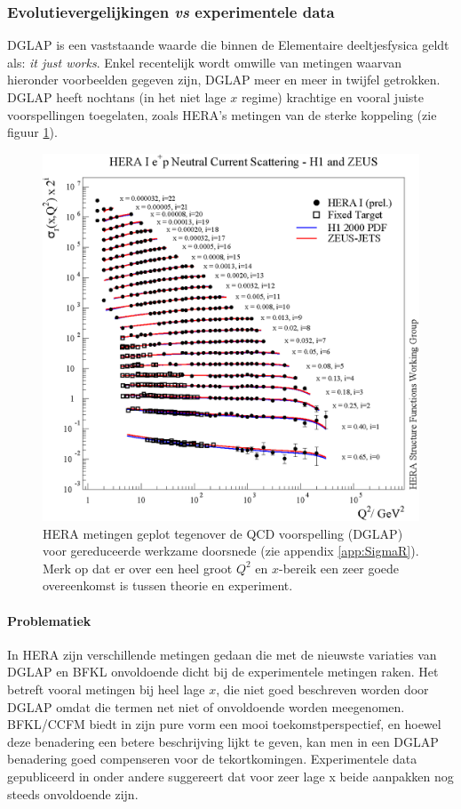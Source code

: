 \documentclass[a4paper,11pt]{article}
\numberwithin{equation}{section} %
\begin{document}
    \subsubsection{Evolutievergelijkingen \textit{vs} experimentele data} \label{sec:QCDvsExperiment}
DGLAP is een vaststaande waarde die binnen de Elementaire deeltjesfysica geldt als: \textit{it just works}.
Enkel recentelijk wordt omwille van metingen waarvan hieronder voorbeelden gegeven zijn, DGLAP meer en meer in twijfel getrokken.
DGLAP heeft nochtans (in het niet lage $x$ regime) krachtige en vooral juiste voorspellingen toegelaten, zoals HERA’s metingen van de sterke koppeling (zie figuur \ref{fig:SC}).
\begin{figure} [H]
  \begin{center}
    \includegraphics[scale=1]{Afbeeldingen/HERAF2.eps}
    \caption{HERA metingen geplot tegenover de QCD voorspelling (DGLAP) voor gereduceerde werkzame doorsnede (zie appendix \ref{app:SigmaR}). Merk op dat er over een heel groot $Q^2$ en $x$-bereik een zeer goede overeenkomst is tussen theorie en experiment. \cite{Kiesling}}
   \label{fig:SC}
  \end{center}
\end{figure}

      \paragraph{Problematiek}
In HERA zijn verschillende metingen gedaan die met de nieuwste variaties van DGLAP en BFKL onvoldoende dicht bij de experimentele metingen raken.
Het betreft vooral metingen bij heel lage $x$, die niet goed beschreven worden door DGLAP omdat die termen net niet  of onvoldoende worden meegenomen.
BFKL/CCFM biedt in zijn pure vorm een mooi toekomstperspectief, en hoewel deze benadering een betere beschrijving lijkt te geven, kan men in een DGLAP benadering goed compenseren voor de tekortkomingen.
Experimentele data gepubliceerd in onder andere \cite{Kiesling} suggereert dat voor zeer lage x beide aanpakken nog steeds onvoldoende zijn.
\end{document}
